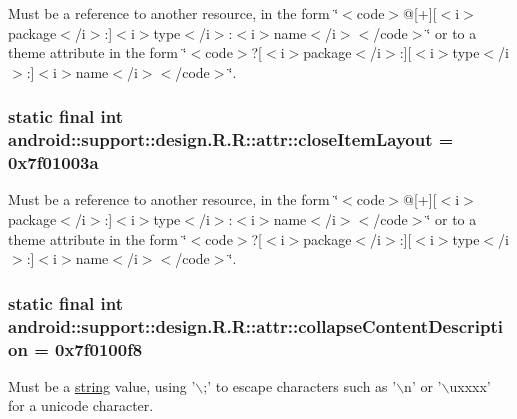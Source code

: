 Must be a reference to another resource, in the form \char`\"{}$<$code$>$@\mbox{[}+\mbox{]}\mbox{[}$<$i$>$package$<$/i$>$:\mbox{]}$<$i$>$type$<$/i$>$:$<$i$>$name$<$/i$>$$<$/code$>$\char`\"{} or to a theme attribute in the form \char`\"{}$<$code$>$?\mbox{[}$<$i$>$package$<$/i$>$:\mbox{]}\mbox{[}$<$i$>$type$<$/i$>$:\mbox{]}$<$i$>$name$<$/i$>$$<$/code$>$\char`\"{}. \hypertarget{classandroid_1_1support_1_1design_1_1_r_1_1attr_66a905703b4cf947faa6d10fcb8b6acc}{
\subsubsection[{closeItemLayout}]{\setlength{\rightskip}{0pt plus 5cm}static final int android::support::design.R.R::attr::closeItemLayout = 0x7f01003a}}
\label{classandroid_1_1support_1_1design_1_1_r_1_1attr_66a905703b4cf947faa6d10fcb8b6acc}


Must be a reference to another resource, in the form \char`\"{}$<$code$>$@\mbox{[}+\mbox{]}\mbox{[}$<$i$>$package$<$/i$>$:\mbox{]}$<$i$>$type$<$/i$>$:$<$i$>$name$<$/i$>$$<$/code$>$\char`\"{} or to a theme attribute in the form \char`\"{}$<$code$>$?\mbox{[}$<$i$>$package$<$/i$>$:\mbox{]}\mbox{[}$<$i$>$type$<$/i$>$:\mbox{]}$<$i$>$name$<$/i$>$$<$/code$>$\char`\"{}. \hypertarget{classandroid_1_1support_1_1design_1_1_r_1_1attr_afa0dedca1e6b5249f7b66f43149796c}{
\subsubsection[{collapseContentDescription}]{\setlength{\rightskip}{0pt plus 5cm}static final int android::support::design.R.R::attr::collapseContentDescription = 0x7f0100f8}}
\label{classandroid_1_1support_1_1design_1_1_r_1_1attr_afa0dedca1e6b5249f7b66f43149796c}


Must be a \hyperlink{classandroid_1_1support_1_1design_1_1_r_1_1string}{string} value, using '$\backslash$;' to escape characters such as '$\backslash$n' or '$\backslash$uxxxx' for a unicode character. 

